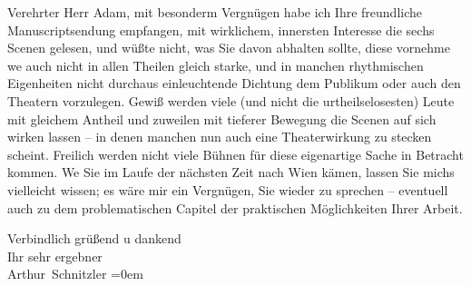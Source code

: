 \pstart{}Verehrter Herr Adam,\pend\vspace{0.5em}
\pstart
           mit besonderm Vergnügen habe ich Ihre freundliche Manuscriptsendung empfangen, mit wirklichem, innersten
               Interesse die sechs Scenen gelesen, und wüßte nicht, was Sie davon abhalten sollte,
               diese vornehme we{\geminationn} auch nicht in allen Theilen gleich
               starke, und in manchen rhythmischen Eigenheiten nicht durchaus einleuchtende Dichtung
               dem Publikum oder auch den Theatern vorzulegen. Gewiß werden viele (und nicht die
               urtheilselosesten) {\pb}\introOben{}Leute\introOben{} mit gleichem Antheil und zuweilen mit tieferer
               Bewegung die Scenen auf sich wirken lassen – in denen manchen nun auch eine
               Theaterwirkung zu stecken scheint. Freilich werden nicht viele Bühnen für diese
               eigenartige Sache in Betracht kommen. We{\geminationn} Sie im Laufe
               der nächsten Zeit nach Wien kämen, lassen Sie
               michs vielleicht wissen; es wäre mir ein Vergnügen, Sie wieder zu sprechen –
               eventuell auch zu dem problematischen Capitel der praktischen Möglichkeiten Ihrer Arbeit.\pend
           
\pstart
           Verbindlich grüßend u dankend{\\[\baselineskip]}Ihr sehr ergebner{\\[\baselineskip]}\spacefill\mbox{Arthur Schnitzler}\pend
           \leftskip=0em{}\endnumbering{}  \newcommand{\dateiname}{L02208}\newcommand{\titel}{Arthur Schnitzler an Robert Adam, 18. 6. 1915}\newcommand{\editorInnen}{Martin Anton Müller und Gerd-Hermann Susen}
